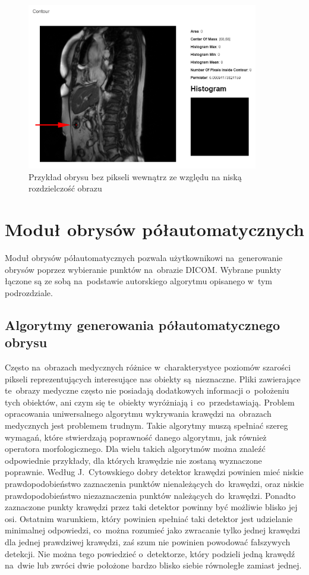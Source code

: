 \documentclass[a4paper,11pt,twoside,openright]{report}
\theoremstyle{definition}
\begin{document}
\begin{figure}[h]
	\center
	\includegraphics[width=0.9\textwidth]{manualny-0px}
	\caption{Przykład obrysu bez pikseli wewnątrz ze względu na niską rozdzielczość obrazu}
    	\label{fig:manual-0px}
\end{figure}

\section {Moduł obrysów półautomatycznych}

Moduł obrysów półautomatycznych pozwala użytkownikowi na~generowanie
obrysów poprzez wybieranie punktów na~obrazie DICOM. Wybrane punkty łączone są
ze sobą na~podstawie autorskiego algorytmu opisanego w~tym podrozdziale.

\subsection {Algorytmy generowania półautomatycznego obrysu}

Często na~obrazach medycznych różnice w~charakterystyce poziomów szarości pikseli
reprezentujących interesujące nas obiekty są~nieznaczne. Pliki zawierające te~obrazy medyczne często nie posiadają
dodatkowych informacji o~położeniu tych obiektów, ani czym się te~obiekty wyróżniają i~co~przedstawiają.
Problem opracowania uniwersalnego algorytmu wykrywania krawędzi na~obrazach medycznych
jest problemem trudnym. Takie algorytmy muszą spełniać szereg wymagań,
które stwierdzają poprawność danego algorytmu, jak również operatora morfologicznego.
Dla wielu takich algorytmów można znaleźć odpowiednie przykłady,
dla których krawędzie nie zostaną wyznaczone poprawnie. Według J.~Cytowskiego \cite{Cyfrowe przetwarzanie
obrazów medycznych} dobry detektor krawędzi powinien mieć niskie prawdopodobieństwo
zaznaczenia punktów nienależących do~krawędzi, oraz niskie prawdopodobieństwo
niezaznaczenia punktów należących do~krawędzi. Ponadto zaznaczone punkty krawędzi
przez taki detektor powinny być możliwie blisko jej osi. Ostatnim warunkiem, który powinien
spełniać taki detektor jest udzielanie minimalnej odpowiedzi, co~można rozumieć jako zwracanie
tylko jednej krawędzi dla jednej prawdziwej krawędzi, zaś szum nie powinien powodować
fałszywych detekcji. Nie można tego powiedzieć o~detektorze, który podzieli jedną krawędź
na~dwie lub zwróci dwie położone bardzo blisko siebie równoległe zamiast jednej.
\end{document}
